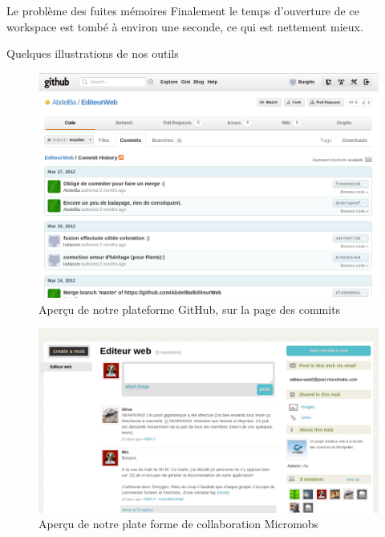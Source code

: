 \documentclass[a4paper, 12pt]{report}
\begin{document}
\begin{chapter}
\begin{section}{Le problème des fuites mémoires}
		Finalement le temps d'ouverture de ce workspace est tombé à environ une seconde, ce qui est nettement mieux.
	\end{section}
	\begin{section}{Quelques illustrations de nos outils}
		\begin{figure}[ht]
			\begin{center}
			\includegraphics[width=18cm]{images/GitHub.png}
			\caption{Aperçu de notre plateforme GitHub, sur la page des commits}
			\label{commit}
			\end{center}
		\end{figure}	
		\begin{figure}[ht]
			\begin{center}
			\includegraphics[width=18cm]{images/Micromobs.png}
			\caption{Aperçu de notre plate forme de collaboration Micromobs}
			\label{mmobs}
			\end{center}
		\end{figure}
	\end{section}
	\end{chapter}
\end{document}
